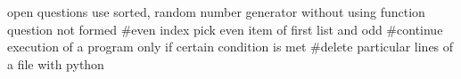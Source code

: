open questions
use sorted, random number generator without using function
question not formed #even index pick even item of first list and odd 
#continue execution of a program only if certain condition is met
#delete particular lines of a file with python
